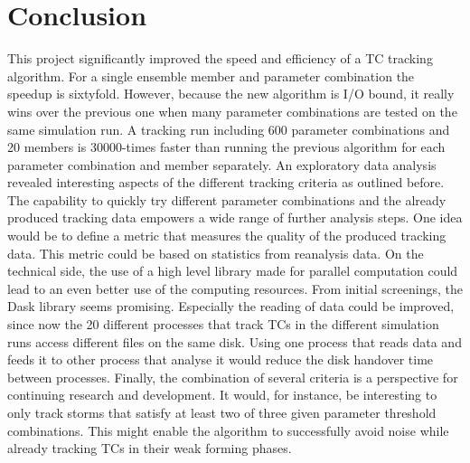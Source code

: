 \chapter{Conclusion}\label{sec:conclusion}
This project significantly improved the speed and efficiency of a TC tracking algorithm. For a single ensemble member and parameter combination the speedup is sixtyfold. However, because the new algorithm is I/O bound, it really wins over the previous one when many parameter combinations are tested on the same simulation run. A tracking run including 600 parameter combinations and 20 members is 30000-times faster than running the previous algorithm for each parameter combination and member separately. \newline
An exploratory data analysis revealed interesting aspects of the different tracking criteria as outlined before. The capability to quickly try different parameter combinations and the already produced tracking data empowers a wide range of further analysis steps. One idea would be to define a metric that measures the quality of the produced tracking data. This metric could be based on statistics from reanalysis data.\newline
On the technical side, the use of a high level library made for parallel computation could lead to an even better use of the computing resources. From initial screenings, the Dask library \cite{dask} seems promising. Especially the reading of data could be improved, since now the 20 different processes that track TCs in the different simulation runs access different files on the same disk. Using one process that reads data and feeds it to other process that analyse it would reduce the disk handover time between processes.\newline
Finally, the combination of several criteria is a perspective for continuing research and development. It would, for instance, be interesting to only track storms that satisfy at least two of three given parameter threshold combinations. This might enable the algorithm to successfully avoid noise while already tracking TCs in their weak forming phases.
